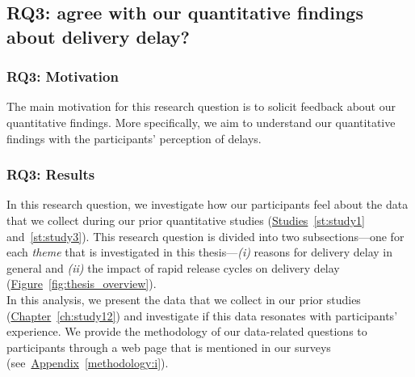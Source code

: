 
\subsection{RQ3: \DIFdelbegin {}\DIFdelend \DIFaddbegin {}\DIFaddend agree with our quantitative
findings about delivery delay?}\label{ch5:rq3}

\subsubsection*{RQ3: Motivation}

The main motivation for this research question is to solicit feedback about our
quantitative findings. More specifically, we aim to understand \DIFdelbegin {}\DIFdelend \DIFaddbegin {}\DIFaddend our
quantitative findings \DIFdelbegin {}\DIFdelend \DIFaddbegin {}\DIFaddend with the participants' perception of \DIFdelbegin {}\DIFdelend \DIFaddbegin {}\DIFaddend delays.

\subsubsection*{RQ3: Results}

In this research question, we investigate how our participants feel about the
data that we collect during our prior quantitative studies
(\hyperref[st:study1]{Studies}~\ref{st:study1} and~\ref{st:study3}). This
research question is divided into two subsections---one for each {\em theme}
that is investigated in this thesis---{\em (i)} reasons for delivery delay in
general and {\em (ii)} the impact of rapid release cycles on delivery delay
(\hyperref[fig:thesis_overview]{Figure}~\ref{fig:thesis_overview}).\\

\noindent\DIFdelbegin \textit{\textbf{}%
}%
\DIFdelend \DIFaddbegin {}
\DIFaddend In this analysis, we present the data that we collect in our prior studies
(\hyperref[ch:study12]{Chapter}~\ref{ch:study12}) and investigate if this data
resonates with participants' experience. We provide the methodology of our
data-related questions to participants through a web page that is mentioned in
our surveys (see~\hyperref[methodology:i]{Appendix}~\ref{methodology:i}).

